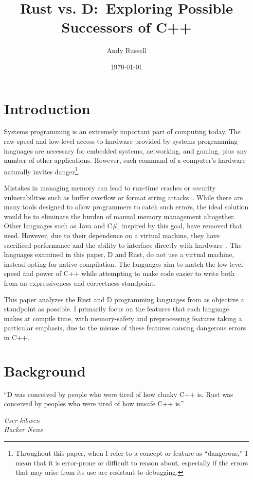 \documentclass[finalcopy]{srpaper}
\title{Rust vs. D:\ Exploring Possible Successors of C++}
\author{Andy Russell}
\date{\today}
\begin{document}
\frontmatter

\listoflistings{}

\chapter{Introduction}

Systems programming is an extremely important part of computing today. The raw
speed and low-level access to hardware provided by systems programming
languages are necessary for embedded systems, networking, and gaming, plus any
number of other applications. However, such command of a computer's hardware
naturally invites danger\footnote{Throughout this paper, when I refer to a
concept or feature as ``dangerous,'' I mean that it is error-prone or difficult
to reason about, especially if the errors that may arise from its use are
resistant to debugging.}.

Mistakes in managing memory can lead to run-time crashes or security
vulnerabilities such as buffer overflow or format string
attacks~\cite{Shahriar:2012:MPS:2187671.2187673,Seacord:2013:SCC:2530475}.
While there are many tools designed to allow programmers to catch such errors,
the ideal solution would be to eliminate the burden of manual memory management
altogether. Other languages such as Java and C\#, inspired by this goal, have
removed that need. However, due to their dependence on a virtual machine, they
have sacrificed performance and the ability to interface directly with
hardware~\cite{Alexandrescu:2010:DPL:1875434}. The languages examined in this
paper, D and Rust, do not use a virtual machine, instead opting for native
compilation. The languages aim to match the low-level speed and power of C++
while attempting to make code easier to write both from an expressiveness and
correctness standpoint.

This paper analyzes the Rust and D programming languages from as objective a
standpoint as possible. I primarily focus on the features that each language
makes at compile time, with memory-safety and preprocessing features taking a
particular emphasis, due to the misuse of these features causing dangerous
errors in C++.

\chapter{Background}\label{chap:background}

\epigraph{``D was conceived by people who were tired of how clunky C++ is. Rust
was conceived by peoples who were tired of how unsafe C++ is.''}{
\textit{User kibwen \\ Hacker News}}
\end{document}
